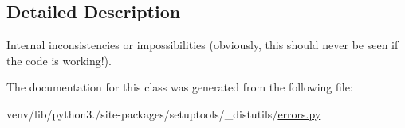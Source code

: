 \subsection{Detailed Description}
\begin{DoxyVerb}Internal inconsistencies or impossibilities (obviously, this
should never be seen if the code is working!).\end{DoxyVerb}
 

The documentation for this class was generated from the following file\+:\begin{DoxyCompactItemize}
\item 
venv/lib/python3./site-\/packages/setuptools/\+\_\+distutils/\hyperlink{__distutils_2errors_8py}{errors.\+py}\end{DoxyCompactItemize}
